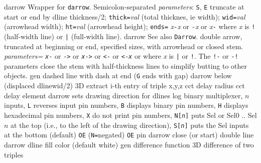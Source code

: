   {darrow}
  {Wrapper for {\tt darrow}.
  Semicolon-separated {\sl parameters}:
    {\tt S}, {\tt E} truncate at start or end by dline thickness/2;
    {\tt thick=}{\sl val}   (total thicknes, ie width);
    {\tt wid=}{\sl val}     (arrowhead width);
    {\tt ht=}{\sl val}      (arrowhead height);
    {\tt ends=}
      {\sl x}{\tt -}{\sl x} or
      {\tt -}{\sl x} or
      {\sl x}{\tt -} where {\sl x} is {\tt !} (half-width line)
       or {\tt |} (full-width line).}
  {darrow}
  {See also {\tt Darrow}.
   double arrow, truncated at beginning or end, specified sizes,
    with arrowhead or closed stem.
    {\sl parameters=}
    {\tt {\sl x}-} or {\tt ->} or {\tt {\sl x}->} or {\tt <-} or {\tt <-{\sl x}}
    or {\tt <->} where {\sl x} is {\tt |} or {\tt !}.
    The {\tt !-} or {\tt -!} parameters close
    the stem with half-thickness lines to simplify butting to other objects. }
  {gen}
  {dashed line with dash at end ({\tt G} ends with gap)}
  {darrow}
  {below (displaced dlinewid/2)}
  {3D}
  {extract i-th entry of triple x,y,z}
  {cct}
  {delay radius}
  {cct}
  {delay element}
  {darrow}
  {sets drawing direction for dlines}
  {log}
  {binary multiplexer, $n$ inputs,
    {\tt L} reverses input pin numbers,
    {\tt B} displays binary pin numbers,
    {\tt H} displays hexadecimal pin numbers,
    {\tt X} do not print pin numbers,
    {\tt N[{\sl n}]} puts Sel or Sel$0$ .. Sel$n$ at the top
    (i.e., to the left of the drawing direction),
    {\tt S[{\sl n}]} puts the Sel inputs at the bottom (default)
    {\tt OE} ({\tt N=}negated) {\tt OE} pin
    }
  {darrow}
  {close (or start) double line}
  {darrow}
  {dline fill color (default white)}
  {gen}
  {difference function}
  {3D}
  {difference of two triples}
